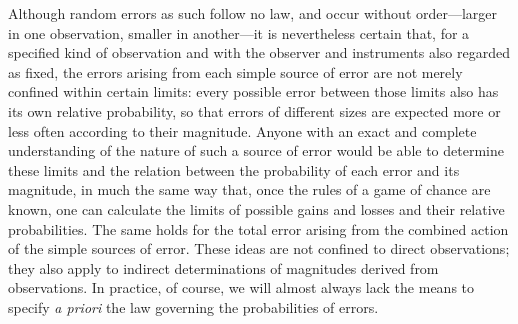 Although random errors as such follow no law, and occur without order—larger in one observation, smaller in another—it is nevertheless certain that, for a specified kind of observation and with the observer and instruments also regarded as fixed, the errors arising from each simple source of error are not merely confined within certain limits: every possible error between those limits also has its own relative probability, so that errors of different sizes are expected more or less often according to their magnitude. Anyone with an exact and complete understanding of the nature of such a source of error would be able to determine these limits and the relation between the probability of each error and its magnitude, in much the same way that, once the rules of a game of chance are known, one can calculate the limits of possible gains and losses and their relative probabilities. The same holds for the total error arising from the combined action of the simple sources of error. These ideas are not confined to direct observations; they also apply to indirect determinations of magnitudes derived from observations. In practice, of course, we will almost always lack the means to specify \textit{a priori} the law governing the probabilities of errors.

